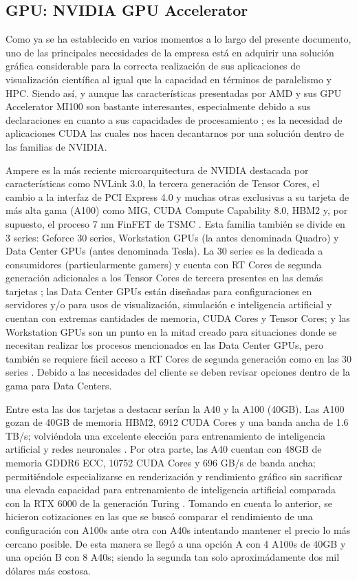 \documentclass[conference,onecolumn]{IEEEtran}
\begin{document}
\subsection{GPU: NVIDIA GPU Accelerator}
Como ya se ha establecido en varios momentos a lo largo del presente documento, uno de las principales necesidades de la empresa está en adquirir una solución gráfica considerable para la correcta realización de sus aplicaciones de visualización científica al igual que la capacidad en términos de paralelismo y HPC. Siendo así, y aunque las características presentadas por AMD y sus GPU Accelerator MI100 son bastante interesantes, especialmente debido a sus declaraciones en cuanto a sus capacidades de procesamiento \cite{amdMI100}; es la necesidad de aplicaciones CUDA las cuales nos hacen decantarnos por una solución dentro de las familias de NVIDIA. \cite{CUDAnt}  \medbreak

Ampere es la más reciente microarquitectura de NVIDIA destacada por características como NVLink 3.0, la tercera generación de Tensor Cores, el cambio a la interfaz de PCI Express 4.0 y muchas otras exclusivas a su tarjeta de más alta gama (A100) como MIG, CUDA Compute Capability 8.0, HBM2 y, por supuesto, el proceso 7 nm FinFET de TSMC \cite{nvidiaAmpBlog}. Esta familia también se divide en 3 series: Geforce 30 series, Workstation GPUs (la antes denominada Quadro) y Data Center GPUs (antes denominada Tesla). La 30 series es la dedicada a consumidores (particularmente gamers) y cuenta con RT Cores de segunda generación adicionales a los Tensor Cores de tercera presentes en las demás tarjetas \cite{nvidia30}; las Data Center GPUs están diseñadas para configuraciones en servidores y/o para usos de visualización, simulación e inteligencia artificial y cuentan con extremas cantidades de memoria, CUDA Cores y Tensor Cores; y las Workstation GPUs son un punto en la mitad creado para situaciones donde se necesitan realizar los procesos mencionados en las Data Center GPUs, pero también se requiere fácil acceso a RT Cores de segunda generación como en las 30 series \cite{nvidiaAmp}. Debido a las necesidades del cliente se deben revisar opciones dentro de la gama para Data Centers. \medbreak

Entre esta las dos tarjetas a destacar serían la A40 y la A100 (40GB). Las A100 gozan de 40GB de memoria HBM2, 6912 CUDA Cores y una banda ancha de 1.6 TB/s; volviéndola una excelente elección para entrenamiento de inteligencia artificial y redes neuronales \cite{pny}. Por otra parte, las A40 cuentan con 48GB de memoria GDDR6 ECC, 10752 CUDA Cores y 696 GB/s de banda ancha; permitiéndole especializarse en renderización y rendimiento gráfico sin sacrificar una elevada capacidad para entrenamiento de inteligencia artificial comparada con la RTX 6000 de la generación Turing \cite{nvidiaa40}. Tomando en cuenta lo anterior, se hicieron cotizaciones en las que se buscó comparar el rendimiento de una configuración con A100s ante otra con A40s intentando mantener el precio lo más cercano posible. De esta manera se llegó a una opción A con 4 A100s de 40GB y una opción B con 8 A40s; siendo la segunda tan solo aproximádamente dos mil dólares más costosa. \medbreak
\end{document}

